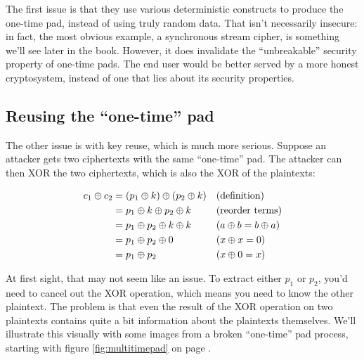 \documentclass[11pt,ebook,table,dvipsnames]{memoir}
\begin{document}
The first issue is that they use various deterministic constructs to
produce the one-time pad, instead of using truly random data. That
isn't necessarily insecure: in fact, the most obvious example, a
synchronous \gls{stream cipher}, is something we'll see later in the
book. However, it does invalidate the \enquote{unbreakable} security property
of one-time pads. The end user would be better served by a more honest
cryptosystem, instead of one that lies about its security properties.
\subsection{Reusing the \enquote{one-time} pad}
\label{sec-2-1-5-2}

The other issue is with key reuse, which is much more serious. Suppose
an attacker gets two ciphertexts with the same \enquote{one-time} pad. The
attacker can then XOR the two ciphertexts, which is also the XOR of
the plaintexts:

\begin{align*}
c_1 \oplus c_2
&= (p_1 \oplus k) \oplus (p_2 \oplus k) && (\text{definition})\\
&= p_1 \oplus k \oplus p_2 \oplus k && (\text{reorder terms})\\
&= p_1 \oplus p_2 \oplus k \oplus k && (a \oplus b = b \oplus a) \\
&= p_1 \oplus p_2 \oplus 0 && (x \oplus x = 0) \\
&= p_1 \oplus p_2 && (x \oplus 0 = x)
\end{align*}

At first sight, that may not seem like an issue. To extract either
$p_1$ or $p_2$, you'd need to cancel out the XOR operation, which
means you need to know the other plaintext. The problem is that even
the result of the XOR operation on two plaintexts contains quite a bit
information about the plaintexts themselves. We'll illustrate this
visually with some images from a broken \enquote{one-time} pad process,
starting with figure \ref{fig:multitimepad} on page
\pageref{fig:multitimepad}.
\end{document}

